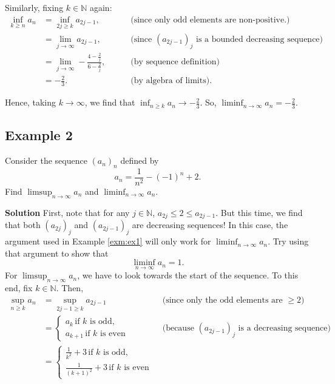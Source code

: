\documentclass[
  12pt,
  a4paper]{extarticle}
\theoremstyle{plain}
\theoremstyle{definition}
\theoremstyle{plain}
\theoremstyle{plain}
\theoremstyle{plain}
\theoremstyle{plain}
\theoremstyle{definition}
\theoremstyle{definition}
\theoremstyle{remark}
\theoremstyle{remark}
\let\BeginKnitrBlock\begin \let\EndKnitrBlock\end
\renewcommand{\;}{\,}
\begin{document}
Similarly, fixing \(k \in \mathbb{N}\) again:
\begin{align*}
\inf_{k\geq n}a_n &= \inf_{2j \geq k} a_{2j-1}, \; \; &&\text{(since only odd elements are non-positive.)}\\
&= \lim_{j \to \infty} a_{2j-1}, \; \; &&\text{(since $(a_{2j-1})_j$ is a bounded decreasing sequence)},\\
&= \lim_{j \to \infty}-\frac{4-\frac{2}{j}}{6 - \frac{2}{j}}, \; \; \quad &&\text{(by sequence definition)}\\
&= -\frac{2}{3}. \; \; \quad &&\text{(by algebra of limits)}.
\end{align*}

Hence, taking \(k \to \infty\), we find that \(\inf_{n \geq k} a_n \to -\frac{2}{3}\). So, \(\liminf_{n \to \infty} a_n = -\frac{2}{3}\).

\hypertarget{example-2}{%
\subsection*{Example 2}\label{example-2}}

\BeginKnitrBlock{example}
{\label{exm:ex2} }Consider the sequence \((a_n)_{n}\) defined by \[a_n = \frac{1}{n^2} - (-1)^n + 2.\] Find \(\limsup_{n \to \infty} a_n\) and \(\liminf_{n \to \infty} a_n\).
\EndKnitrBlock{example}

\textbf{Solution}
First, note that for any \(j\in\mathbb{N}\), \(a_{2j} \leq 2 \leq a_{2j-1}\). But this time, we find that both \((a_{2j})_j\) and \((a_{2j-1})_j\) are decreasing sequences! In this case, the argument used in Example \ref{exm:ex1} will only work for \(\liminf_{n\to\infty} a_n.\) Try using that argument to show that \[\liminf_{n\to\infty}a_n = 1.\] For \(\limsup_{n\to\infty} a_n\), we have to look towards the start of the sequence. To this end, fix \(k \in \mathbb{N}\). Then,
\begin{align*}
\sup_{n\geq k}a_n &= \sup_{2j-1 \geq k} a_{2j - 1} \; \; &&\text{(since only the odd elements are $\geq 2$)}\\
&=\begin{cases}
a_k \; \text{if $k$ is odd},\\
a_{k+1} \; \text{if $k$ is even}\end{cases} \; \; &&\text{(because $(a_{2j-1})_j$ is a decreasing sequence)}\\
&=\begin{cases}
\frac{1}{k^2} + 3 \; \text{if $k$ is odd},\\
\frac{1}{(k+1)^2} + 3 \; \text{if $k$ is even}\end{cases}
\end{align*}
\end{document}
